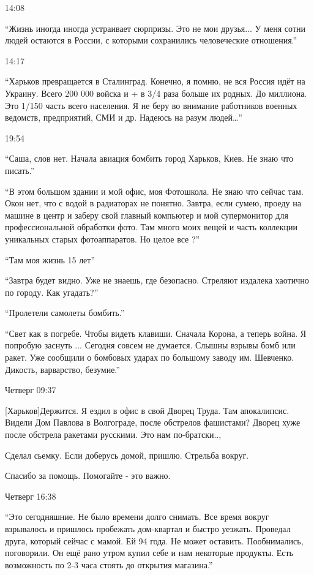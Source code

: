 14:08

\enquote{Жизнь иногда иногда устраивает сюрпризы. Это не мои друзья... У меня сотни людей
остаются в России, с которыми сохранились человеческие отношения.}

14:17

\enquote{Харьков превращается в Сталинград. Конечно, я помню, не вся Россия идёт на
Украину. Всего 200 000 войска и + в 3/4 раза больше их родных. До миллиона.
Это 1/150 часть всего населения. Я не беру во внимание работников военных
ведомств, предприятий, СМИ и др. Надеюсь на разум людей…}

19:54

\enquote{Саша, слов нет. Начала авиация бомбить город Харьков, Киев. Не знаю что писать.}

\enquote{В этом большом здании и мой офис, моя Фотошкола. Не знаю что сейчас там. Окон
нет, что с водой в радиаторах не понятно. Завтра, если сумею, проеду на машине
в центр и заберу свой главный компьютер и мой супермонитор для профессиональной
обработки фото. Там много моих вещей и часть коллекции уникальных старых
фотоаппаратов. Но целое все ?}

\enquote{Там моя жизнь 15 лет}

\enquote{Завтра будет видно. Уже не знаешь, где безопасно. Стреляют издалека хаотично по городу. Как угадать?}

\enquote{Пролетели самолеты бомбить.}

\enquote{Свет как в погребе. Чтобы видеть клавиши. Сначала Корона, а теперь война.  Я
попробую заснуть ... Сегодня совсем не думается. Слышны взрывы бомб или ракет.
Уже сообщили о бомбовых ударах по большому заводу им. Шевченко. Дикость,
варварство, безумие.}

Четверг 09:37

[Харьков]Держится. Я ездил в офис в свой Дворец Труда. Там апокалипсис. Видели
Дом Павлова в Волгограде, после обстрелов фашистами? Дворец хуже после обстрела
ракетами русскими. Это нам по-братски..,

Сделал сьемку. Если доберусь домой, пришлю. Стрельба вокруг.

Спасибо за помощь. Помогайте - это важно.

Четверг 16:38

\enquote{Это сегодняшние. Не было времени долго снимать. Все время вокруг взрывалось и
пришлось пробежать дом-квартал и быстро уезжать. Проведал друга, который
сейчас с мамой. Ей 94 года. Не может оставить. Пообнимались, поговорили. Он ещё
рано утром купил себе и нам некоторые продукты. Есть возможность по 2-3 часа
стоять до открытия магазина.}

